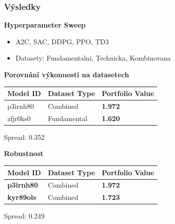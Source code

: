 \begin{frame}
    \frametitle{Výsledky}
    \textbf{Hyperparameter Sweep}
    \begin{itemize}
        \item A2C, SAC, DDPG, PPO, TD3
        \item Datasety: Fundamentalni, Technicka, Kombinovana
    \end{itemize}
    \textbf{Porovnání výkonnosti na datasetech}
    \begin{table}
        \centering
        {\footnotesize
            \begin{tabular}{|l|l|l|}
                \hline
                \textbf{Model ID} & \textbf{Dataset Type} & \textbf{Portfolio Value}                   \\ \hline
                p3irnh80          & Combined              & \textcolor[RGB]{50,150,50}{\textbf{1.972}} \\ \hline
                zfjr0ks0          & Fundamental           & \textcolor[RGB]{150,50,50}{\textbf{1.620}} \\ \hline
            \end{tabular}

            Spread: 0.352
        }
        \label{tab:datasets-comparison}
    \end{table}
    \textbf{Robustnost}
    \begin{table}[H]
        \centering
        {\footnotesize
            \begin{tabular}{|l|l|l|}
                \hline
                \textbf{Model ID}  & \textbf{Dataset Type} & \textbf{Portfolio Value}                   \\ \hline
                \bfseries p3irnh80 & Combined              & \textcolor[RGB]{50,150,50}{\textbf{1.972}} \\ \hline
                \bfseries kyr89ols & Combined              & \textcolor[RGB]{150,50,50}{\textbf{1.723}} \\ \hline
            \end{tabular}

            Spread: 0.249
        }
    \end{table}
\end{frame}

